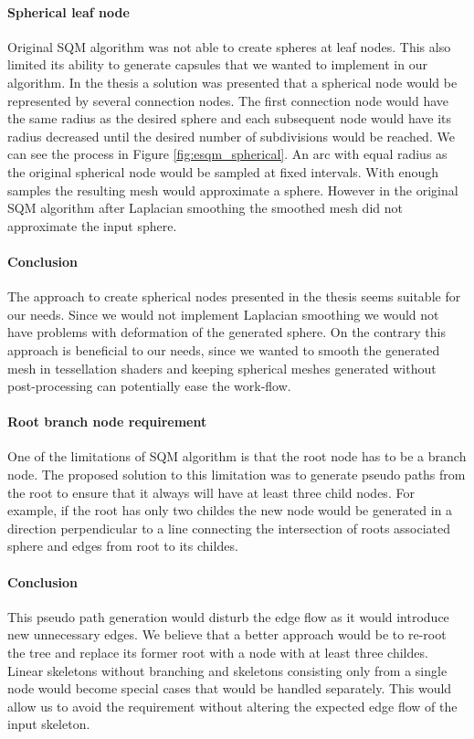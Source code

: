 \paragraph{Spherical leaf node}
Original SQM algorithm was not able to create spheres at leaf nodes. This also limited its ability to generate capsules that we wanted to implement in our algorithm. In the thesis a solution was presented that a spherical node would be represented by several connection nodes. The first connection node would have the same radius as the desired sphere and each subsequent node would have its radius decreased until the desired number of subdivisions would be reached. We can see the process in Figure \ref{fig:esqm_spherical}. An arc with equal radius as the original spherical node would be sampled at fixed intervals. With enough samples the resulting mesh would approximate a sphere. However in the original SQM algorithm after Laplacian smoothing the smoothed mesh did not approximate the input sphere.

\paragraph{Conclusion}
The approach to create spherical nodes presented in the thesis seems suitable for our needs. Since we would not implement Laplacian smoothing we would not have problems with deformation of the generated sphere. On the contrary this approach is beneficial to our needs, since we wanted to smooth the generated mesh in tessellation shaders and keeping spherical meshes generated without post-processing can potentially ease the work-flow.

\paragraph{Root branch node requirement}
One of the limitations of SQM algorithm is that the root node has to be a branch node. The proposed solution to this limitation was to generate pseudo paths from the root to ensure that it always will have at least three child nodes. For example, if the root has only two childes the new node would be generated in a direction perpendicular to a line connecting the intersection of roots associated sphere and edges from root to its childes.

\paragraph{Conclusion}
This pseudo path generation would disturb the edge flow as it would introduce new unnecessary edges. We believe that a better approach would be to re-root the tree and replace its former root with a node with at least three childes. Linear skeletons without branching and skeletons consisting only from a single node would become special cases that would be handled separately. This would allow us to avoid the requirement without altering the expected edge flow of the input skeleton.